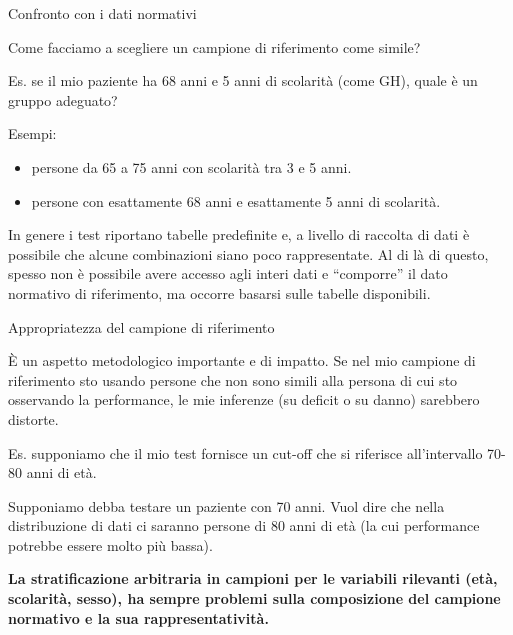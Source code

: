 \documentclass[
  ignorenonframetext,
]{beamer}
\providecommand{\tightlist}{%
  \setlength{\itemsep}{0pt}\setlength{\parskip}{0pt}}
\begin{document}
\begin{frame}{Confronto con i dati normativi}
\label{confronto-con-i-dati-normativi-1}
\small

Come facciamo a scegliere un campione di riferimento come simile?

Es. se il mio paziente ha 68 anni e 5 anni di scolarità (come GH), quale
è un gruppo adeguato?

Esempi:

\begin{itemize}
\tightlist
\item
  persone da 65 a 75 anni con scolarità tra 3 e 5 anni.
\item
  persone con esattamente 68 anni e esattamente 5 anni di scolarità.
\end{itemize}

In genere i test riportano tabelle predefinite e, a livello di raccolta
di dati è possibile che alcune combinazioni siano poco rappresentate. Al
di là di questo, spesso non è possibile avere accesso agli interi dati e
``comporre'' il dato normativo di riferimento, ma occorre basarsi sulle
tabelle disponibili.
\end{frame}

\begin{frame}{Appropriatezza del campione di riferimento}
\label{appropriatezza-del-campione-di-riferimento}
\small

È un aspetto metodologico importante e di impatto. Se nel mio campione
di riferimento sto usando persone che non sono simili alla persona di
cui sto osservando la performance, le mie inferenze (su deficit o su
danno) sarebbero distorte.

Es. supponiamo che il mio test fornisce un cut-off che si riferisce
all'intervallo 70-80 anni di età.

Supponiamo debba testare un paziente con 70 anni. Vuol dire che nella
distribuzione di dati ci saranno persone di 80 anni di età (la cui
performance potrebbe essere molto più bassa).

\textbf{La stratificazione arbitraria in campioni per le variabili
rilevanti (età, scolarità, sesso), ha sempre problemi sulla composizione
del campione normativo e la sua rappresentatività.}
\end{frame}
\end{document}
